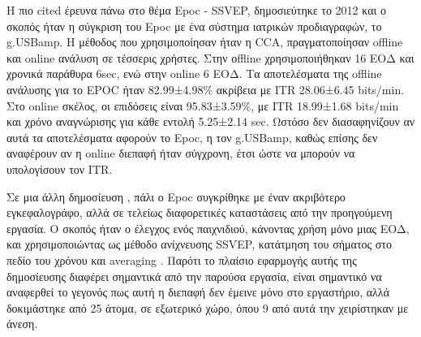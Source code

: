 \documentclass[11pt,a4paper,english,greek,twoside]{../Thesis}
\begin{document}
\par Η πιο cited έρευνα πάνω στο θέμα Epoc - SSVEP, δημοσιεύτηκε το 2012 \cite{Liu2012-qj} και ο σκοπός ήταν η σύγκριση του Epoc με ένα σύστημα ιατρικών προδιαγραφών, το  g.USBamp. H μέθοδος που χρησιμοποίησαν ήταν η CCA, πραγματοποίησαν offline και online ανάλυση σε τέσσερις χρήστες. Στην οffline χρησιμοποιήθηκαν 16 ΕΟΔ και χρονικά παράθυρα 6sec, ενώ στην online 6 ΕΟΔ. Τα αποτελέσματα της offline ανάλυσης για το EPOC ήταν 82.99±4.98\% ακρίβεια με ITR 28.06±6.45 bits/min. Στο online σκέλος, οι επιδόσεις είναι 95.83±3.59\%, με ITR 18.99±1.68 bits/min και χρόνο αναγνώρισης για κάθε εντολή 5.25±2.14 sec. Ωστόσο δεν διασαφηνίζουν αν αυτά τα αποτελέσματα αφορούν το Epoc, η τον g.USBamp, καθώς επίσης δεν αναφέρουν αν η online διεπαφή ήταν σύγχρονη, έτσι ώστε να μπορούν να υπολογίσουν τον ITR. 

\par Σε μια άλλη δημοσίευση \cite{noauthor_undated-vk}, πάλι ο Epoc συγκρίθηκε με έναν ακριβότερο εγκεφαλογράφο, αλλά σε τελείως διαφορετικές καταστάσεις από την προηγούμενη εργασία. Ο σκοπός ήταν ο έλεγχος ενός παιχνιδιού, κάνοντας χρήση μόνο μιας ΕΟΔ, και χρησιμοποιώντας ως μέθοδο ανίχνευσης SSVEP, κατάτμηση του σήματος στο πεδίο του χρόνου και averaging \cite{Friman2007-xm}. Παρότι το πλαίσιο εφαρμογής αυτής της δημοσίευσης διαφέρει σημαντικά από την παρούσα εργασία, είναι σημαντικό να αναφερθεί το γεγονός πως αυτή η διεπαφή δεν έμεινε μόνο στο εργαστήριο, αλλά δοκιμάστηκε από 25 άτομα, σε εξωτερικό χώρο, όπου 9 από αυτά την χειρίστηκαν με άνεση.


\end{document}
